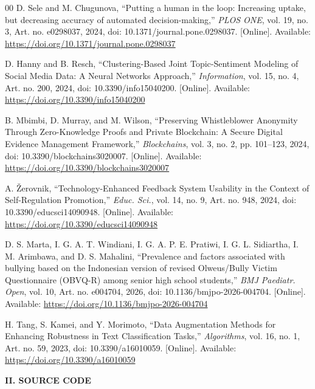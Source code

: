 \documentclass[conference]{IEEEtran}
\begin{document}
\begin{thebibliography}{00}
D. Sele and M. Chugunova, ``Putting a human in the loop: Increasing uptake, but decreasing accuracy of automated decision-making,'' \textit{PLOS ONE}, vol. 19, no. 3, Art. no. e0298037, 2024, doi: 10.1371/journal.pone.0298037. [Online]. Available: \url{https://doi.org/10.1371/journal.pone.0298037}

D. Hanny and B. Resch, ``Clustering-Based Joint Topic-Sentiment Modeling of Social Media Data: A Neural Networks Approach,'' \textit{Information}, vol. 15, no. 4, Art. no. 200, 2024, doi: 10.3390/info15040200. [Online]. Available: \url{https://doi.org/10.3390/info15040200}

B. Mbimbi, D. Murray, and M. Wilson, ``Preserving Whistleblower Anonymity Through Zero-Knowledge Proofs and Private Blockchain: A Secure Digital Evidence Management Framework,'' \textit{Blockchains}, vol. 3, no. 2, pp. 101--123, 2024, doi: 10.3390/blockchains3020007. [Online]. Available: \url{https://doi.org/10.3390/blockchains3020007}

A. \v{Z}erovnik, ``Technology-Enhanced Feedback System Usability in the Context of Self-Regulation Promotion,'' \textit{Educ. Sci.}, vol. 14, no. 9, Art. no. 948, 2024, doi: 10.3390/educsci14090948. [Online]. Available: \url{https://doi.org/10.3390/educsci14090948}

D. S. Marta, I. G. A. T. Windiani, I. G. A. P. E. Pratiwi, I. G. L. Sidiartha, I. M. Arimbawa, and D. S. Mahalini, ``Prevalence and factors associated with bullying based on the Indonesian version of revised Olweus/Bully Victim Questionnaire (OBVQ-R) among senior high school students,'' \textit{BMJ Paediatr. Open}, vol. 10, Art. no. e004704, 2026, doi: 10.1136/bmjpo-2026-004704. [Online]. Available: \url{https://doi.org/10.1136/bmjpo-2026-004704}

H. Tang, S. Kamei, and Y. Morimoto, ``Data Augmentation Methods for Enhancing Robustness in Text Classification Tasks,'' \textit{Algorithms}, vol. 16, no. 1, Art. no. 59, 2023, doi: 10.3390/a16010059. [Online]. Available: \url{https://doi.org/10.3390/a16010059}
\end{thebibliography}

\clearpage
\onecolumn
\pagestyle{empty}

\begin{center}
	{\Large\bfseries II. SOURCE CODE}\par
\end{center}
\end{document}
